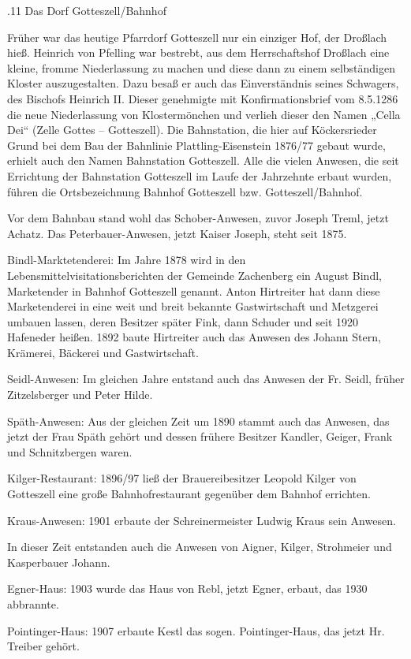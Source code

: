 .11 Das Dorf Gotteszell/Bahnhof

Früher war das heutige Pfarrdorf Gotteszell nur ein einziger Hof, der Droßlach
hieß. Heinrich von Pfelling war bestrebt, aus dem Herrschaftshof Droßlach eine
kleine, fromme Niederlassung zu machen und diese dann zu einem selbständigen
Kloster auszugestalten. Dazu besaß er auch das Einverständnis seines Schwagers,
des Bischofs Heinrich II. Dieser genehmigte mit Konfirmationsbrief vom 8.5.1286
die neue Niederlassung von Klostermönchen und verlieh dieser den Namen „Cella
Dei“ (Zelle Gottes – Gotteszell). Die Bahnstation, die hier auf Köckersrieder
Grund bei dem Bau der Bahnlinie Plattling-Eisenstein 1876/77 gebaut wurde,
erhielt auch den Namen Bahnstation Gotteszell. Alle die vielen Anwesen, die seit
Errichtung der Bahnstation Gotteszell im Laufe der Jahrzehnte erbaut wurden,
führen die Ortsbezeichnung Bahnhof Gotteszell bzw. Gotteszell/Bahnhof.

Vor dem Bahnbau stand wohl das Schober-Anwesen, zuvor Joseph Treml, jetzt
Achatz. Das Peterbauer-Anwesen, jetzt Kaiser Joseph, steht seit 1875.

Bindl-Marktetenderei: Im Jahre 1878 wird in den Lebensmittelvisitationsberichten
der Gemeinde Zachenberg ein August Bindl, Marketender in Bahnhof Gotteszell
genannt. Anton Hirtreiter hat dann diese Marketenderei in eine weit und breit
bekannte Gastwirtschaft und Metzgerei umbauen lassen, deren Besitzer später
Fink, dann Schuder und seit 1920 Hafeneder heißen. 1892 baute Hirtreiter auch
das Anwesen des Johann Stern, Krämerei, Bäckerei und Gastwirtschaft.

Seidl-Anwesen: Im gleichen Jahre entstand auch das Anwesen der Fr. Seidl, früher
Zitzelsberger und Peter Hilde.

Späth-Anwesen: Aus der gleichen Zeit um 1890 stammt auch das Anwesen, das jetzt
der Frau Späth gehört und dessen frühere Besitzer Kandler, Geiger, Frank und
Schnitzbergen waren.

Kilger-Restaurant: 1896/97 ließ der Brauereibesitzer Leopold Kilger von
Gotteszell eine große Bahnhofrestaurant gegenüber dem Bahnhof errichten.

Kraus-Anwesen: 1901 erbaute der Schreinermeister Ludwig Kraus sein Anwesen.

In dieser Zeit entstanden auch die Anwesen von Aigner, Kilger, Strohmeier und
Kasperbauer Johann.

Egner-Haus: 1903 wurde das Haus von Rebl, jetzt Egner, erbaut, das 1930
abbrannte.

Pointinger-Haus: 1907 erbaute Kestl das sogen. Pointinger-Haus, das jetzt Hr.
Treiber gehört.

